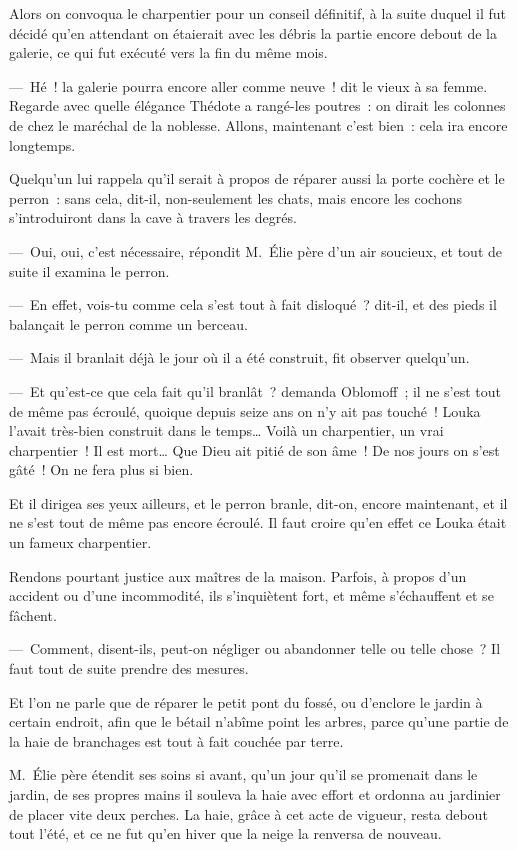 \documentclass[french,twoside]{book} %
\begin{document}
Alors on convoqua le charpentier pour un conseil définitif, à la suite duquel il fut décidé qu’en attendant on étaierait avec les débris la partie encore debout de la galerie, ce qui fut exécuté vers la fin du même mois.\par
— Hé ! la galerie pourra encore aller comme neuve ! dit le vieux à sa femme. Regarde avec quelle élégance Thédote a rangé-les poutres : on dirait les colonnes de chez le maréchal de la noblesse. Allons, maintenant c’est bien : cela ira encore longtemps.\par
Quelqu’un lui rappela qu’il serait à propos de réparer aussi la porte cochère et le perron : sans cela, dit-il, non-seulement les chats, mais encore les cochons s’introduiront dans la cave à travers les degrés.\par
— Oui, oui, c’est nécessaire, répondit M. Élie père d’un air soucieux, et tout de suite il examina le perron.\par
— En effet, vois-tu comme cela s’est tout à fait disloqué ? dit-il, et des pieds il balançait le perron comme un berceau.\par
— Mais il branlait déjà le jour où il a été construit, fit observer quelqu’un.\par
— Et qu’est-ce que cela fait qu’il branlât ? demanda Oblomoff ; il ne s’est tout de même pas écroulé, quoique depuis seize ans on n’y ait pas touché ! Louka l’avait très-bien construit dans le temps… Voilà un charpentier, un vrai charpentier ! Il est mort… Que Dieu ait pitié de son âme ! De nos jours on s’est gâté ! On ne fera plus si bien.\par
Et il dirigea ses yeux ailleurs, et le perron branle, dit-on, encore maintenant, et il ne s’est tout de même pas encore écroulé. Il faut croire qu’en effet ce Louka était un fameux charpentier.\par
Rendons pourtant justice aux maîtres de la maison. Parfois, à propos d’un accident ou d’une incommodité, ils s’inquiètent fort, et même s’échauffent et se fâchent.\par
— Comment, disent-ils, peut-on négliger ou abandonner telle ou telle chose ? Il faut tout de suite prendre des mesures.\par
Et l’on ne parle que de réparer le petit pont du fossé, ou d’enclore le jardin à certain endroit, afin que le bétail n’abîme point les arbres, parce qu’une partie de la haie de branchages est tout à fait couchée par terre.\par
M. Élie père étendit ses soins si avant, qu’un jour qu’il se promenait dans le jardin, de ses propres mains il souleva la haie avec effort et ordonna au jardinier de placer vite deux perches. La haie, grâce à cet acte de vigueur, resta debout tout l’été, et ce ne fut qu’en hiver que la neige la renversa de nouveau.\par
\end{document}
